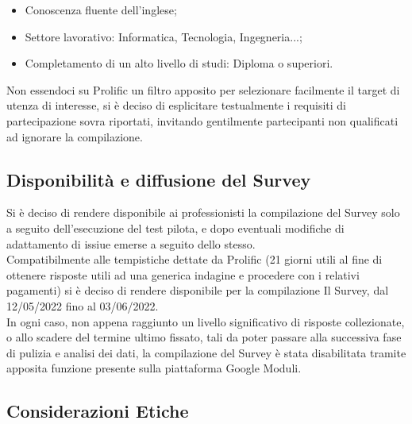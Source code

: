     \begin{itemize}
        \item Conoscenza fluente dell'inglese;
        \item Settore lavorativo: Informatica, Tecnologia, Ingegneria...;
        \item Completamento di un alto livello di studi: Diploma o superiori.
    \end{itemize}
    
    Non essendoci su Prolific un filtro apposito per selezionare facilmente il target di utenza di interesse, si è deciso di esplicitare testualmente i requisiti di partecipazione sovra riportati, invitando gentilmente partecipanti non qualificati ad ignorare la compilazione. 
    
    
    \subsection{Disponibilità e diffusione del Survey}
    Si è deciso di rendere disponibile ai professionisti la compilazione del Survey solo a seguito dell'esecuzione del test pilota, e dopo eventuali modifiche di adattamento di issiue emerse a seguito dello stesso.\\ Compatibilmente alle tempistiche dettate da Prolific (21 giorni utili al fine di ottenere risposte utili ad una generica indagine e procedere con i relativi pagamenti) si è deciso di rendere disponibile per la compilazione Il Survey, dal 12/05/2022 fino al 03/06/2022.\\
    
    In ogni caso, non appena raggiunto un livello significativo di risposte collezionate, o allo scadere del termine ultimo fissato, tali da poter passare alla successiva fase di pulizia e analisi dei dati, la compilazione del Survey è stata disabilitata tramite apposita funzione presente sulla piattaforma Google Moduli.
    
     \subsection{Considerazioni Etiche}
    
